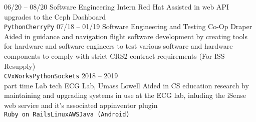 \documentclass[9pt]{developercv} %
\begin{document}
\vspace{0.5cm}





\begin{entrylist}
	\entry
		{06/20 -- 08/20}
		{Software Engineering Intern}
		{Red Hat}
		{Assisted in web API upgrades to the Ceph Dashboard\\
        \texttt{Python}\slashsep\texttt{CherryPy}}
	\entry
		{07/18 -- 01/19}
		{Software Engineering and Testing Co-Op}
		{Draper}
		{Aided in guidance and navigation flight software development by creating
        tools for hardware and software engineers to test various software and
        hardware components to comply with strict CRS2 contract requirements (For ISS Resupply)\\
        \texttt{C}\slashsep\texttt{VxWorks}\slashsep\texttt{Python}\slashsep\texttt{Sockets}}
	\entry
		{2018 -- 2019\\\footnotesize{part time}}
		{Lab tech}
        {ECG Lab, Umass Lowell}
		{Aided in CS education research by maintaining and upgrading systems in use at the ECG lab,
        inluding the iSense web service and it's associated appinventor plugin\\
        \texttt{Ruby on Rails}\slashsep\texttt{Linux}\slashsep\texttt{AWS}\slashsep\texttt{Java (Android)}}
\end{entrylist}
\end{document}
